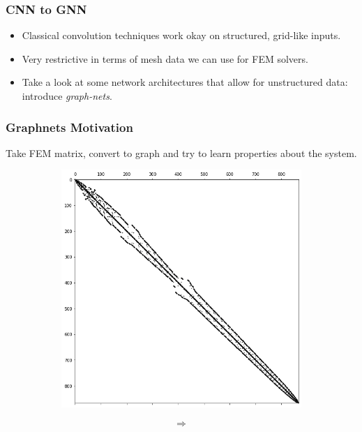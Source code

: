 \documentclass[handout]{beamer}
\begin{document}
\begin{frame}
  \frametitle{CNN to GNN}
  \begin{itemize}
  \item Classical convolution techniques work okay on structured, grid-like inputs.
  \item Very restrictive in terms of mesh data we can use for FEM solvers.
  \item Take a look at some network architectures that allow for unstructured data: introduce \textit{graph-nets}.
  \end{itemize}
\end{frame}


\begin{frame}
  \frametitle{Graphnets Motivation}
  Take FEM matrix, convert to graph and try to learn properties about the system.
  \begin{figure}[h]
  \begin{subfigure}{.40\textwidth}
    \includegraphics[width=\textwidth]{figures/sparse.png}
  \end{subfigure}
  \begin{subfigure}{.08\textwidth}
    \[ \Longrightarrow \]
  \end{subfigure}
  \begin{subfigure}{.40\textwidth}

\end{subfigure}
\end{figure}
\end{frame}
\end{document}
